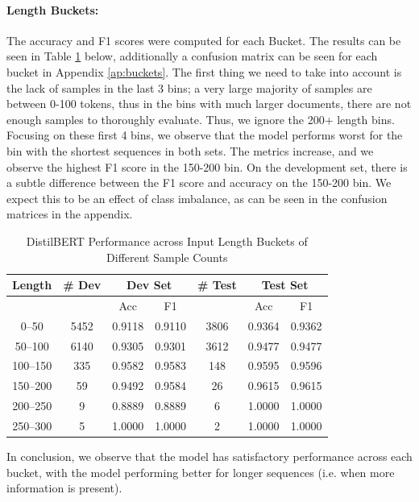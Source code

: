 \documentclass[12pt,a4paper,english]{article}
\begin{document}
\paragraph{Length Buckets:} The accuracy and F1 scores were computed for each Bucket. The results can be seen in Table \ref{tab:length_buckets_counts} below, additionally a confusion matrix can be seen for each bucket in Appendix \ref{ap:buckets}. The first thing we need to take into account is the lack of samples in the last 3 bins; a very large majority of samples are between 0-100 tokens, thus in the bins with much larger documents, there are not enough samples to thoroughly evaluate. Thus, we ignore the 200+ length bins. Focusing on these first 4 bins, we observe that the model performs worst for the bin with the shortest sequences in both sets. The metrics increase, and we observe the highest F1 score in the 150-200 bin. On the development set, there is a subtle difference between the F1 score and accuracy on the 150-200 bin. We expect this to be an effect of class imbalance, as can be seen in the confusion matrices in the appendix.
\begin{table}[h]
\centering
\begin{tabular}{|c|c|cc|c|cc|}
\hline
\textbf{Length} & \textbf{\# Dev} & \multicolumn{2}{c|}{\textbf{Dev Set}} & \textbf{\# Test} & \multicolumn{2}{c|}{\textbf{Test Set}} \\ \hline
 &  & Acc & F1 &  & Acc & F1 \\ \hline
0--50   & 5452 & 0.9118 & 0.9110 & 3806 & 0.9364 & 0.9362 \\
50--100 & 6140 & 0.9305 & 0.9301 & 3612 & 0.9477 & 0.9477 \\
100--150& 335  & 0.9582 & 0.9583 & 148  & 0.9595 & 0.9596 \\
150--200& 59   & 0.9492 & 0.9584 & 26   & 0.9615 & 0.9615 \\
200--250& 9    & 0.8889 & 0.8889 & 6    & 1.0000 & 1.0000 \\
250--300& 5    & 1.0000 & 1.0000 & 2    & 1.0000 & 1.0000 \\ \hline
\end{tabular}
\caption{DistilBERT Performance across Input Length Buckets of Different Sample Counts}
\label{tab:length_buckets_counts}
\end{table}

In conclusion, we observe that the model has satisfactory performance across each bucket, with the model performing better for longer sequences (i.e. when more information is present).
\end{document}
